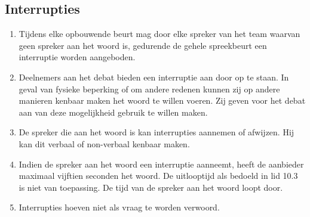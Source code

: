 \subsection{Interrupties}

\begin{enumerate}
\item Tijdens elke opbouwende beurt mag door elke spreker van het team waarvan geen spreker aan het woord is, gedurende de gehele spreekbeurt een interruptie worden aangeboden. 
\item Deelnemers aan het debat bieden een interruptie aan door op te staan. In geval van fysieke beperking of om andere redenen kunnen zij op andere manieren kenbaar maken het woord te willen voeren. Zij geven voor het debat aan van deze mogelijkheid gebruik te willen maken.
\item De spreker die aan het woord is kan interrupties aannemen of afwijzen. Hij kan dit verbaal of non-verbaal kenbaar maken.
\item Indien de spreker aan het woord een interruptie aanneemt, heeft de aanbieder maximaal vijftien seconden het woord. De uitlooptijd als bedoeld in lid 10.3 is niet van toepassing. De tijd van de spreker aan het woord loopt door. 
\item Interrupties hoeven niet als vraag te worden verwoord.
\end{enumerate}
